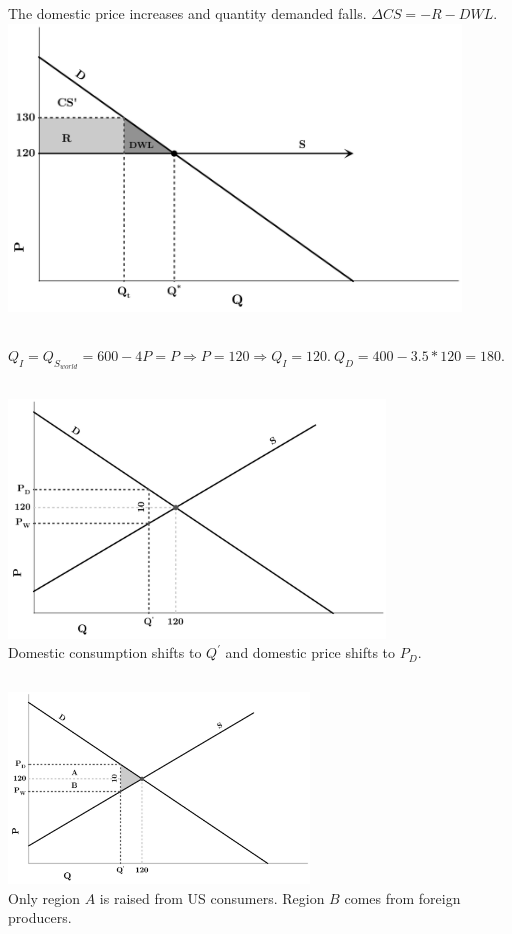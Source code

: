\documentclass{article}
\begin{document}
	\subsection[d]{}
		The domestic price increases and quantity demanded falls. $\Delta CS = -R - DWL.$\\
		\includegraphics[height=3in]{Charts/3d}
	\subsection[e]{}
		$Q_I=Q_{S_{world}} = 600-4P = P \Rightarrow P = 120 \Rightarrow Q_I =  120.~ Q_D=400-3.5*120 =180. $
	\subsection[f]{}
		\includegraphics[height=2.5in]{Charts/3f}\\
		Domestic consumption shifts to $Q^{'}$ and domestic price shifts to $P_D$. 
	\subsection[g]{}
		\includegraphics[height=2in]{Charts/3g}\\
		Only region $A$ is raised from US consumers. Region $B$ comes from foreign producers. 
\end{document}
